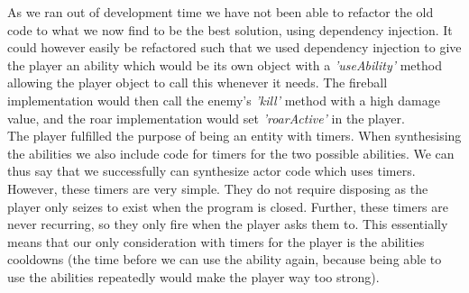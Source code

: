 As we ran out of development time we have not been able to refactor the old code to what we now find to be the best solution, using dependency injection. It could however easily be refactored such that we used dependency injection to give the player an ability which would be its own object with a \textit{'useAbility'} method allowing the player object to call this whenever it needs. The fireball implementation would then call the enemy's \textit{'kill'} method with a high damage value, and the roar implementation would set \textit{'roarActive'} in the player.\\

The player fulfilled the purpose of being an entity with timers. When synthesising the abilities we also include code for timers for the two possible abilities. We can thus say that we successfully can synthesize actor code which uses timers. However, these timers are very simple. They do not require disposing as the player only seizes to exist when the program is closed. Further, these timers are never recurring, so they only fire when the player asks them to. This essentially means that our only consideration with timers for the player is the abilities cooldowns (the time before we can use the ability again, because being able to use the abilities repeatedly would make the player way too strong).  